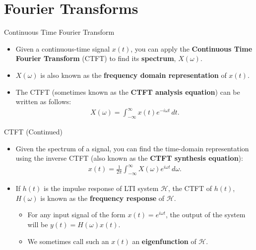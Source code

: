 \section{Fourier Transforms}

\begin{frame}{Continuous Time Fourier Transform}
    \begin{itemize}
        \item Given a continuous-time signal $x(t)$, you can apply the \textbf{Continuous Time Fourier Transform} (CTFT) to find its \textbf{spectrum}, $X(\omega)$. 
        \item $X(\omega)$ is also known as the \textbf{frequency domain representation} of $x(t)$.
        \item The CTFT (sometimes known as the \textbf{CTFT analysis equation}) can be written as follows:
        \begin{align*}
            X(\omega) = \int_{-\infty}^\infty x(t) e^{-i\omega t}\, dt. 
        \end{align*}
    \end{itemize}
\end{frame}

\begin{frame}{CTFT (Continued)}
    \begin{itemize}
        \item Given the spectrum of a signal, you can find the time-domain representation using the inverse CTFT (also known as the \textbf{CTFT synthesis equation}):
        \begin{align*}
            x(t) = \frac{1}{2\pi} \int_{-\infty}^\infty X(\omega) e^{i\omega t}\, d\omega. 
        \end{align*}
        \item If $h(t)$ is the impulse response of LTI system $\mathcal{H}$, the CTFT of $h(t)$, $H(\omega)$ is known as the \textbf{frequency response} of $\mathcal{H}$. 
        \begin{itemize}
            \item For any input signal of the form $x(t) = e^{i\omega t}$, the output of the system will be $y(t) = H(\omega) x(t)$.
            \item We sometimes call such an $x(t)$ an \textbf{eigenfunction} of $\mathcal{H}$.
        \end{itemize}
    \end{itemize}
\end{frame}

